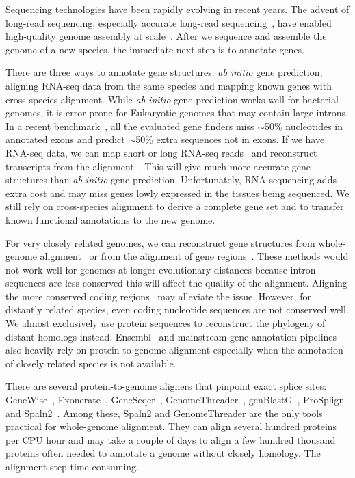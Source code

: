 \documentclass{bioinfo}
\begin{document}
Sequencing technologies have been rapidly evolving in recent years. The advent
of long-read sequencing, especially accurate long-read
sequencing~\citep{Wenger:2019ab}, have enabled high-quality genome assembly at
scale~\citep{Nurk:2020we,Cheng:2021aa,Cheng:2022aa}. After we sequence and
assemble the genome of a new species, the immediate next step is to annotate
genes.

There are three ways to annotate gene structures: \emph{ab initio} gene
prediction, aligning RNA-seq data from the same species and mapping known genes
with cross-species alignment.  While \emph{ab initio} gene prediction works
well for bacterial genomes, it is error-prone for Eukaryotic
genomes that may contain large introns. In a recent
benchmark~\citep{Scalzitti:2020wg}, all the evaluated gene finders miss
$\sim$50\% nucleotides in annotated exons and predict $\sim$50\% extra
sequences not in exons. If we have RNA-seq data, we can map short or long
RNA-seq reads~\citep{Dobin:2013kx,Li:2018ab} and reconstruct transcripts from
the alignment~\citep{Kovaka:2019wf}. This will give much more accurate gene
structures than \emph{ab initio} gene prediction. Unfortunately, RNA sequencing
adds extra cost and may miss genes lowly expressed in the tissues being
sequenced. We still rely on cross-species alignment to derive a complete gene
set and to transfer known functional annotations to the new genome.

For very closely related genomes, we can reconstruct gene structures from
whole-genome alignment~\citep{Fiddes:2018wn} or from the alignment of gene
regions~\citep{Shumate:2020ty}. These methods would not work well for genomes
at longer evolutionary distances because intron sequences are less conserved
this will affect the quality of the alignment. Aligning the more conserved
coding regions~\citep{Li:2007aa,Gotoh:2008aa} may alleviate the issue. However,
for distantly related species, even coding nucleotide sequences are not
conserved well. We almost exclusively use protein sequences to
reconstruct the phylogeny of distant homologs instead.
Ensembl~\citep{Aken:2016wr} and mainstream gene annotation
pipelines~\citep{Holt:2011tt,Bruna:2021ug} also heavily rely on
protein-to-genome alignment especially when the annotation of closely related
species is not available.

There are several protein-to-genome aligners that pinpoint exact splice sites:
GeneWise~\citep{Birney:1997vr,Birney:2004uy}, Exonerate~\citep{Slater:2005aa},
GeneSeqer~\citep{Usuka:2000vi},
GenomeThreader~\citep{DBLP:journals/infsof/GremmeBSK05},
genBlastG~\citep{She:2011aa}, ProSplign~\citep{Kapustin:2008tq} and
Spaln2~\citep{Gotoh:2008aa,Iwata:2012aa}. Among these, Spaln2 and
GenomeThreader are the only tools practical for whole-genome alignment. They
can align several hundred proteins per CPU hour and may take a couple of days
to align a few hundred thousand proteins often needed to annotate a genome
without closely homology. The alignment step time consuming.
\end{document}
